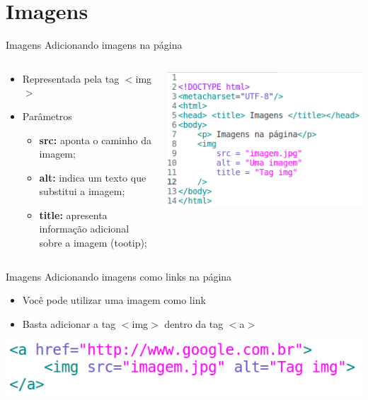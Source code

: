 \documentclass{beamer}
\begin{document}
\section{Imagens}
\begin{frame}{Imagens}
  Adicionando imagens na página
  \begin{columns}
    \begin{column}{0.45 \textwidth}
     \begin{itemize}
      \item Representada pela tag $<$img$>$
       \item Parâmetros
      \begin{itemize}
	 \item \textbf{src:} aponta o caminho da imagem;
	 \item \textbf{alt:} indica um texto que substitui a imagem;
	 \item \textbf{title:} apresenta informação adicional sobre a 
imagem (tootip);
      \end{itemize}
    
     \end{itemize}
    
    \end{column}
    \begin{column}{0.5\textwidth}
     \includegraphics[height=0.45\paperheight]{fig/aula2/html8.png}
    \end{column}
  \end{columns}
\end{frame}
\begin{frame}{Imagens}
  Adicionando imagens como links na página

     \begin{itemize}
      \item Você pode utilizar uma imagem como link
       \item Basta adicionar a tag $<$img$>$ dentro da tag $<$a$>$
     \end{itemize}
   

     \includegraphics[height=0.15\paperheight]{fig/aula2/html9.png}
\end{frame}
\end{document}

